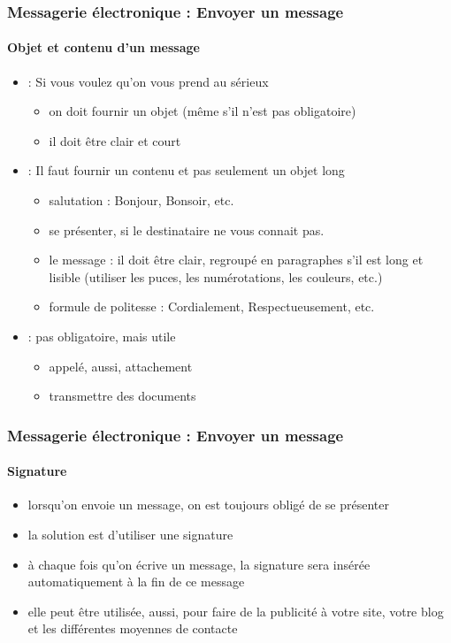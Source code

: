 \documentclass[xcolor=table]{beamer}
\begin{document}
\begin{frame}
\frametitle{Messagerie électronique : Envoyer un message}
\framesubtitle{Objet et contenu d'un message}

\begin{itemize}
	\item {} : Si vous voulez qu'on vous prend au sérieux
	\begin{itemize}
		\item on doit fournir un objet (même s'il n'est pas obligatoire)
		\item il doit être clair et court 
	\end{itemize}
	
	\item {} : Il faut fournir un contenu et pas seulement un objet long 
	\begin{itemize}
		\item salutation : Bonjour, Bonsoir, etc.
		\item se présenter, si le destinataire ne vous connait pas. 
		\item le message : il doit être clair, regroupé en paragraphes s'il est long et lisible (utiliser les puces, les numérotations, les couleurs, etc.)
		\item formule de politesse : Cordialement, Respectueusement, etc.
	\end{itemize}
	
	\item {} : pas obligatoire, mais utile 
	\begin{itemize}
		\item appelé, aussi, attachement
		\item transmettre des documents
	\end{itemize}
	
\end{itemize}

\end{frame}

\begin{frame}
\frametitle{Messagerie électronique : Envoyer un message}
\framesubtitle{Signature}

\begin{itemize}
	\item lorsqu'on envoie un message, on est toujours obligé de se présenter 
	\item la solution est d'utiliser une signature 
	\item à chaque fois qu'on écrive un message, la signature sera insérée automatiquement à la fin de ce message
	\item elle peut être utilisée, aussi, pour faire de la publicité à votre site, votre blog et les différentes moyennes de contacte
\end{itemize}


\end{frame}
\end{document}

